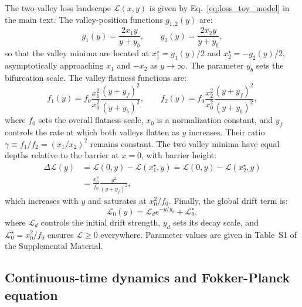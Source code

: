 \documentclass[aps,prx,reprint,superscriptaddress,longbibliography,nofootinbib,floatfix]{revtex4-2}
\begin{document}
The two-valley loss landscape $\mathcal{L}(x,y)$ is given by Eq.~\ref{eq:loss_toy_model} in the main text. The valley-position functions $g_{1,2}(y)$ are:
\begin{equation}
    g_1(y) = \frac{2 x_1 y}{y + y_b}, \qquad
    g_2(y) = \frac{2 x_2 y}{y + y_b},
\end{equation}
so that the valley minima are located at $x_1^{\star} = g_1(y)/2$ and $x_2^{\star} = -g_2(y)/2$, asymptotically approaching $x_1$ and $-x_2$ as $y \to \infty$. The parameter $y_b$ sets the bifurcation scale. The valley flatness functions are:
\begin{equation}
    f_1(y) = f_0 \frac{x_1^2}{x_0^2} \frac{(y+y_f)^2}{(y+y_b)^2},
    \qquad
    f_2(y) = f_0 \frac{x_2^2}{x_0^2} \frac{(y+y_f)^2}{(y+y_b)^2},
\end{equation}
where $f_0$ sets the overall flatness scale, $x_0$ is a normalization constant, and $y_f$ controls the rate at which both valleys flatten as $y$ increases. Their ratio $\gamma \equiv f_1/f_2 = (x_1/x_2)^2$ remains constant. The two valley minima have equal depths relative to the barrier at $x=0$, with barrier height:
\begin{equation}
\begin{split}
    \Delta \mathcal{L}(y)
    &= \mathcal{L}(0, y) - \mathcal{L}(x_1^{\star}, y)
     = \mathcal{L}(0, y) - \mathcal{L}(x_2^{\star}, y)  \\
    &= \frac{x_0^2}{f_0} \frac{y^2}{(y+y_f)^2},
\end{split}
\end{equation}
which increases with $y$ and saturates at $x_0^2/f_0$. Finally, the global drift term is:
\begin{equation}
    \mathcal{L}_0(y) = \mathcal{L}_d e^{-y / y_d} + \mathcal{L}_0^{\star},
\end{equation}
where $\mathcal{L}_d$ controls the initial drift strength, $y_d$ sets its decay scale, and $\mathcal{L}_0^{\star} = x_0^2 / f_0$ ensures $\mathcal{L} \ge 0$ everywhere. Parameter values are given in Table~S1 of the Supplemental Material.

\subsection{Continuous-time dynamics and Fokker-Planck equation} \label{sec:appendix1}
\end{document}
